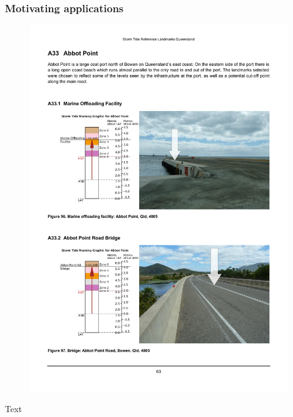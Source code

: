 \begin{frame}
\frametitle{Motivating applications}
\begin{minipage}{0.45\textwidth}
    \begin{figure}      
    \includegraphics[width=\textwidth]{figures/images/qldLandmarkEg.pdf}
    \end{figure}
\end{minipage}
\hfill
\begin{minipage}{0.45\textwidth}
  Text
\end{minipage}

\end{frame}
